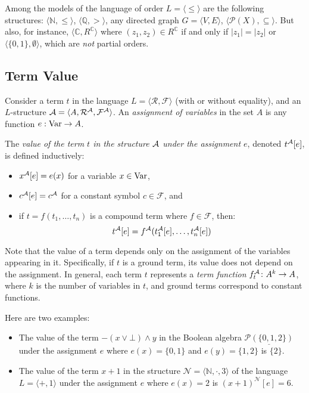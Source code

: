 \begin{example}
    Among the models of the language of order $L=\langle \leq \rangle$ are the following structures: $\langle \mathbb N,\leq\rangle$, $\langle \mathbb Q, > \rangle$, any directed graph $G=\langle V,E\rangle$, $\langle \mathcal P(X),\subseteq\rangle$. But also, for instance, $\langle \mathbb C,R^\mathbb C\rangle$ where $(z_1,z_2)\in R^\mathbb C$ if and only if $|z_1|=|z_2|$ or $\langle \{0,1\},\emptyset\rangle$, which are \emph{not} partial orders.
\end{example}

\subsection{Term Value}

Consider a term $t$ in the language $L=\langle \mathcal R,\mathcal F\rangle$ (with or without equality), and an $L$-structure $\mathcal{A}=\langle A,\mathcal R^{\mathcal{A}},\mathcal F^{\mathcal{A}}\rangle$. An \emph{assignment of variables} in the set $A$ is any function $e:\operatorname{Var}\to A$.

\begin{definition}
    The \emph{value of the term $t$ in the structure $\mathcal{A}$ under the assignment $e$}, denoted $t^{\mathcal{A}}[e]$, is defined inductively:
    \begin{itemize}
        \item $x^{\mathcal{A}}[e]=e(x)$ for a variable $x\in\operatorname{Var}$,
        \item $c^{\mathcal{A}}[e]=c^{\mathcal{A}}$ for a constant symbol $c\in\mathcal F$, and
        \item if $t=f(t_1,\dots,t_n)$ is a compound term where $f\in\mathcal F$, then:
        $$
        t^{\mathcal{A}}[e]=f^{\mathcal{A}}(t_1^{\mathcal{A}}[e],\dots,t_n^{\mathcal{A}}[e])
        $$
    \end{itemize}
\end{definition}

\begin{remark}
    Note that the value of a term depends only on the assignment of the variables appearing in it. Specifically, if $t$ is a ground term, its value does not depend on the assignment.
    In general, each term $t$ represents a \emph{term function} $f_t^{\mathcal{A}}\colon A^k\to A$, where $k$ is the number of variables in $t$, and ground terms correspond to constant functions.
\end{remark}

\begin{example}
    Here are two examples:
    \begin{itemize}
        \item The value of the term $-(x\lor \bot)\land y$ in the Boolean algebra $\underline{\mathcal P(\{0,1,2\})}$ under the assignment $e$ where $e(x)=\{0,1\}$ and $e(y)=\{1,2\}$ is $\{2\}$.
        \item The value of the term $x+1$ in the structure $\mathcal N=\langle\mathbb N,\cdot,3\rangle$ of the language $L=\langle +,1\rangle$ under the assignment $e$ where $e(x)=2$ is $(x+1)^\mathcal N[e]=6$.
    \end{itemize}
\end{example}

